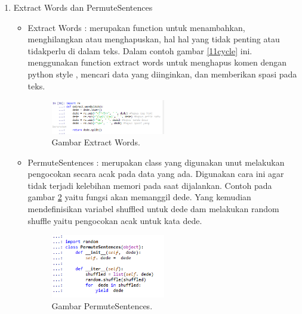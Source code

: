 \begin{enumerate}
\begin{itemize}
		\end{itemize}
\item Extract Words dan PermuteSentences
	\begin{itemize}
	\item Extract Words : merupakan function untuk menambahkan, menghilangkan atau menghapuskan, hal hal yang tidak penting atau tidakperlu di dalam teks. Dalam contoh gambar \ref{11cycle} ini. menggunakan function extract words untuk menghapus komen dengan python style , mencari data yang diinginkan, dan memberikan spasi pada teks.
		\begin{figure}[ht]
		\centerline{\includegraphics[width=0.5\textwidth]{figures/chapter5/14extract.png}}
		\caption{Gambar Extract Words.}	
		\label{14extract}
		\end{figure}
	\item PermuteSentences : merupakan class yang digunakan unut melakukan pengocokan secara acak pada data yang ada. Digunakan cara ini agar tidak terjadi kelebihan memori pada saat dijalankan. Contoh pada gambar \ref{15permute} yaitu fungsi akan memanggil dede. Yang kemudian mendefinisikan variabel shuffled untuk dede dam melakukan random shuffle yaitu pengocokan acak untuk kata dede.
 		\begin{figure}[ht]
		\centerline{\includegraphics[width=0.5\textwidth]{figures/chapter5/15permute.png}}
		\caption{Gambar PermuteSentences.}	
		\label{15permute}
		\end{figure}
	\end{itemize}

\end{enumerate}

